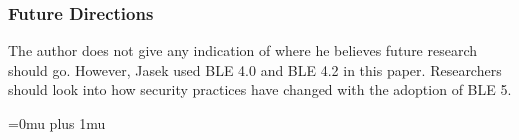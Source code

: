 \subsubsection{Future Directions}
The author does not give any indication of where he believes future research should go. However, Jasek used BLE 4.0 and BLE 4.2 in this paper. Researchers should look into how security practices have changed with the adoption of BLE 5. 
\noindent


\Urlmuskip=0mu plus 1mu\relax

\pagebreak

